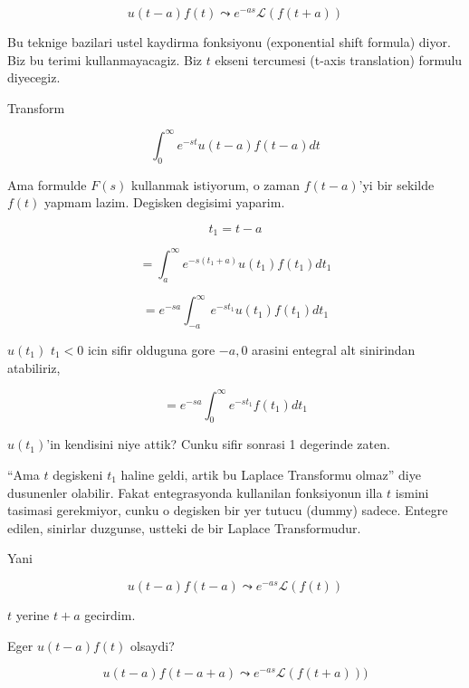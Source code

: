 \documentclass[12pt,fleqn]{article}
\begin{document}
\[ u(t-a)f(t) \leadsto e^{-as}\mathcal{L}(f(t+a)) \]

Bu teknige bazilari ustel kaydirma fonksiyonu (exponential shift formula)
diyor. Biz bu terimi kullanmayacagiz. Biz $t$ ekseni tercumesi (t-axis
translation) formulu diyecegiz. 

Transform

\[ \int_{0}^{\infty}e^{-st}u(t-a)f(t-a) dt \]


Ama formulde $F(s)$ kullanmak istiyorum, o zaman $f(t-a)$'yi bir sekilde
$f(t)$ yapmam lazim. Degisken degisimi yaparim. 

\[ t_1 = t-a \]

\[ = \int_{a}^{\infty}e^{-s(t_1+a)}u(t_1)f(t_1) dt_1 \]

\[ = e^{-sa} \int_{-a}^{\infty}e^{-st_1}u(t_1)f(t_1) dt_1 \]

$u(t_1)$ $t_1<0$ icin sifir olduguna gore $-a,0$ arasini entegral alt
sinirindan atabiliriz, 

\[ = e^{-sa} \int_{0}^{\infty}e^{-st_1}f(t_1) dt_1 \]

$u(t_1)$'in kendisini niye attik? Cunku sifir sonrasi 1 degerinde zaten. 

``Ama $t$ degiskeni $t_1$ haline geldi, artik bu Laplace Transformu olmaz''
diye dusunenler olabilir. Fakat entegrasyonda kullanilan fonksiyonun illa
$t$ ismini tasimasi gerekmiyor, cunku o degisken bir yer tutucu (dummy)
sadece. Entegre edilen, sinirlar duzgunse, ustteki de bir Laplace
Transformudur.

Yani

\[ u(t-a)f(t-a) \leadsto e^{-as}\mathcal{L}(f(t)) \]

$t$ yerine $t+a$ gecirdim.

Eger $u(t-a)f(t)$ olsaydi?

\[ u(t-a)f(t-a+a) \leadsto e^{-as}\mathcal{L}(f(t+a))) \]
\end{document}
